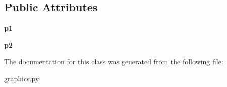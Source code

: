 \subsection*{Public Attributes}
\begin{DoxyCompactItemize}
\item 
{\bfseries p1}\hypertarget{classgraphics_1_1___b_box_a7d6ecb1b61e338a8f28e333c1e242b55}{}\label{classgraphics_1_1___b_box_a7d6ecb1b61e338a8f28e333c1e242b55}

\item 
{\bfseries p2}\hypertarget{classgraphics_1_1___b_box_ae54a3cc11dc9be1624b0fbef0bf22d70}{}\label{classgraphics_1_1___b_box_ae54a3cc11dc9be1624b0fbef0bf22d70}

\end{DoxyCompactItemize}


The documentation for this class was generated from the following file\+:\begin{DoxyCompactItemize}
\item 
graphics.\+py\end{DoxyCompactItemize}
